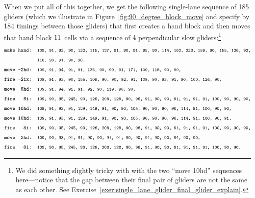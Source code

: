 When we put all of this together, we get the following single-lane sequence of 185 gliders (which we illustrate in Figure~\ref{fig:90_degree_block_move} and specify by 184 timings between those gliders) that first creates a hand block and then moves that hand block $11$~cells via a sequence of $4$ perpendicular slow gliders:\footnote{We did something slightly tricky with with the two ``move 10hd'' sequences here---notice that the gap between their final pair of gliders are not the same as each other. See Exercise~\ref{exer:single_lane_glider_final_glider_explain}.}
\begin{align*}
& \text{\texttt{\footnotesize make hand: {\scriptsize 109, 91, 93, 90, 132, 115, 127, 91, 90, 91, 95, 90, 114, 162, 233, 159, 90, 155, 126, 93,}}} \\
& \text{\texttt{\footnotesize ~~~~~~~~~~~~{\scriptsize 118, 90, 91, 90, 90,}}} \\
& \text{\texttt{\footnotesize move -2hd: {\scriptsize 109, 91, 94, 91, 91, 136, 90, 90, 91, 171, 100, 118, 90, 90,}}} \\
& \text{\texttt{\footnotesize fire -21x: {\scriptsize 109, 91, 93, 90, 155, 106, 90, 90, 92, 91, 109, 90, 93, 91, 90, 100, 124, 90,}}} \\
& \text{\texttt{\footnotesize move~~8hd: {\scriptsize 109, 91, 94, 91, 91, 92, 90, 119, 90, 90,}}} \\
& \text{\texttt{\footnotesize fire~~~8i: {\scriptsize 109, 90, 95, 245, 90, 126, 208, 128, 90, 96, 91, 90, 90, 91, 91, 91, 91, 100, 90, 90, 90,}}} \\
& \text{\texttt{\footnotesize move~10hd: {\scriptsize 109, 91, 93, 91, 129, 149, 91, 90, 90, 105, 90, 90, 90, 90, 114, 91, 100, 90, 90,}}} \\
& \text{\texttt{\footnotesize move~10hd: {\scriptsize 109, 91, 93, 91, 129, 149, 91, 90, 90, 105, 90, 90, 90, 90, 114, 91, 100, 90, 91,}}} \\
& \text{\texttt{\footnotesize fire~~~8i: {\scriptsize 109, 90, 95, 245, 90, 126, 208, 128, 90, 96, 91, 90, 90, 91, 91, 91, 91, 100, 90, 90, 90,}}} \\
& \text{\texttt{\footnotesize move~~2hd: {\scriptsize 109, 90, 93, 91, 91, 90, 90, 91, 91, 90, 90, 91, 90, 90, 94, 90, 90,}}} \\
& \text{\texttt{\footnotesize fire~~~8i: {\scriptsize 109, 90, 95, 245, 90, 126, 208, 128, 90, 96, 91, 90, 90, 91, 91, 91, 91, 100, 90, 90.}}}
\end{align*}

